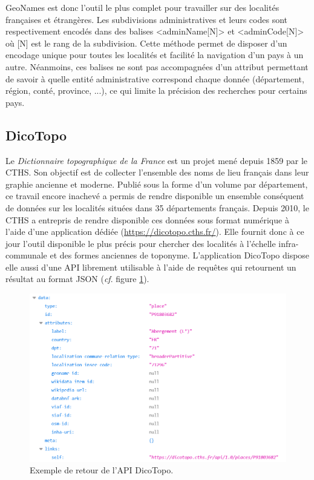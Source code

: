 \documentclass[a4paper,12pt,twoside]{book}
\begin{document}
	
	GeoNames est donc l'outil le plus complet pour travailler sur des localités françaises et étrangères. Les subdivisions administratives et leurs codes sont respectivement encodés dans des balises <adminName[N]> et <adminCode[N]> où [N] est le rang de la subdivision. Cette méthode permet de disposer d'un encodage unique pour toutes les localités et facilité la navigation d'un pays à un autre. Néanmoins, ces balises ne sont pas accompagnées d'un attribut permettant de savoir à quelle entité administrative correspond chaque donnée (département, région, conté, province, ...), ce qui limite la précision des recherches pour certains pays.
	
	\subsection{DicoTopo}
	
	Le \textit{Dictionnaire topographique de la France} est un projet mené depuis 1859 par le CTHS. Son objectif est de collecter l'ensemble des noms de lieu français dans leur graphie ancienne et moderne. Publié sous la forme d'un volume par département, ce travail encore inachevé a permis de rendre disponible un ensemble conséquent de données sur les localités situées dans 35 départements français. Depuis 2010, le CTHS a entrepris de rendre disponible ces données sous format numérique à l'aide d'une application dédiée (\url{https://dicotopo.cths.fr/}). Elle fournit donc à ce jour l'outil disponible le plus précis pour chercher des localités à l'échelle infra-communale et des formes anciennes de toponyme. L'application DicoTopo dispose elle aussi d'une API librement utilisable à l'aide de requêtes qui retournent un résultat au format JSON (\textit{cf}. figure \ref{API_dicotopo}).
	
	\begin{figure}
		\centering
		\includegraphics[width=\textwidth]{Images/Result_dicotopo.png}
		\caption{Exemple de retour de l'API DicoTopo.}
		\label{API_dicotopo}
	\end{figure}
	
\end{document}
